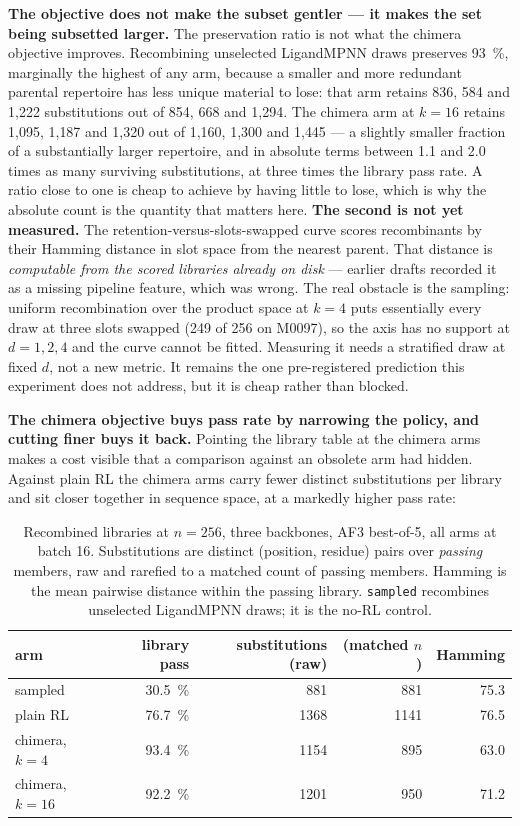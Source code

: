 \textbf{The objective does not make the subset gentler --- it makes the set
being subsetted larger.} The preservation ratio is not what the chimera
objective improves. Recombining unselected LigandMPNN draws preserves
\SI{93}{\percent}, marginally the highest of any arm, because a smaller and
more redundant parental repertoire has less unique material to lose: that arm
retains 836, 584 and 1{,}222 substitutions out of 854, 668 and 1{,}294. The
chimera arm at $k=16$ retains 1{,}095, 1{,}187 and 1{,}320 out of 1{,}160,
1{,}300 and 1{,}445 --- a slightly smaller fraction of a substantially larger
repertoire, and in absolute terms between \num{1.1} and \num{2.0} times as many
surviving substitutions, at three times the library pass rate. A ratio close to
one is cheap to achieve by having little to lose, which is why the absolute
count is the quantity that matters here. \textbf{The second is not yet
measured.} The retention-versus-slots-swapped curve scores recombinants by
their Hamming distance in slot space from the nearest parent. That distance is
\emph{computable from the scored libraries already on disk} --- earlier drafts
recorded it as a missing pipeline feature, which was wrong. The real obstacle
is the sampling: uniform recombination over the product space at $k=4$ puts
essentially every draw at three slots swapped (249 of 256 on M0097), so the
axis has no support at $d=1,2,4$ and the curve cannot be fitted. Measuring it
needs a stratified draw at fixed $d$, not a new metric. It remains the one
pre-registered prediction this experiment does not address, but it is cheap
rather than blocked.

\textbf{The chimera objective buys pass rate by narrowing the policy, and
cutting finer buys it back.} Pointing the library table at the chimera arms
makes a cost visible that a comparison against an obsolete arm had hidden.
Against plain RL the chimera arms carry fewer distinct substitutions per
library and sit closer together in sequence space, at a markedly higher pass
rate:

\begin{table}[h]\centering\small
\caption{Recombined libraries at $n=256$, three backbones, AF3 best-of-5, all
arms at batch 16. Substitutions are distinct (position, residue) pairs over
\emph{passing} members, raw and rarefied to a matched count of passing members.
Hamming is the mean pairwise distance within the passing library. \texttt{sampled}
recombines unselected LigandMPNN draws; it is the no-RL control.}
\label{tab:lib-diversity}
\begin{tabular}{lrrrr}
\toprule
arm & library pass & substitutions (raw) & (matched $n$) & Hamming \\
\midrule
sampled              & \SI{30.5}{\percent} & 881  & 881 & 75.3 \\
plain RL             & \SI{76.7}{\percent} & 1368 & 1141 & 76.5 \\
chimera, $k=4$       & \SI{93.4}{\percent} & 1154 & 895  & 63.0 \\
chimera, $k=16$      & \SI{92.2}{\percent} & 1201 & 950  & 71.2 \\
\bottomrule
\end{tabular}
\end{table}

